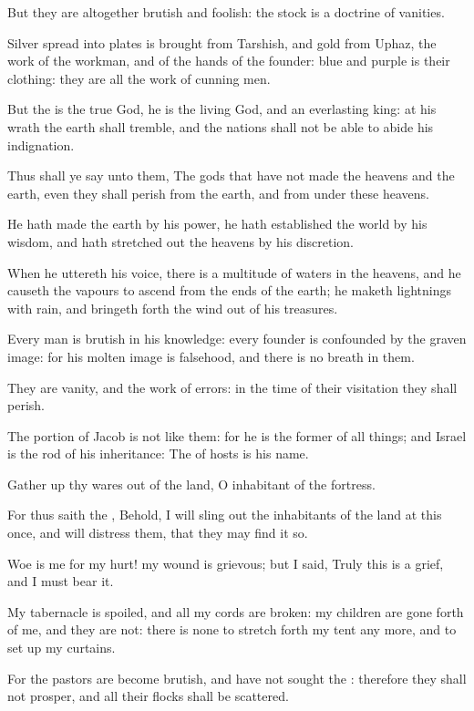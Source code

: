 \verse But they are altogether brutish and foolish: the stock is a doctrine of vanities.

\verse Silver spread into plates is brought from Tarshish, and gold from Uphaz, the work of the workman, and of the hands of the founder: blue and purple is their clothing: they are all the work of cunning men.

\verse But the \LORD is the true God, he is the living God, and an everlasting king: at his wrath the earth shall tremble, and the nations shall not be able to abide his indignation.

\verse Thus shall ye say unto them, The gods that have not made the heavens and the earth, even they shall perish from the earth, and from under these heavens.

\verse He hath made the earth by his power, he hath established the world by his wisdom, and hath stretched out the heavens by his discretion.

\verse When he uttereth his voice, there is a multitude of waters in the heavens, and he causeth the vapours to ascend from the ends of the earth; he maketh lightnings with rain, and bringeth forth the wind out of his treasures.

\verse Every man is brutish in his knowledge: every founder is confounded by the graven image: for his molten image is falsehood, and there is no breath in them.

\verse They are vanity, and the work of errors: in the time of their visitation they shall perish.

\verse The portion of Jacob is not like them: for he is the former of all things; and Israel is the rod of his inheritance: The \LORD of hosts is his name.

\verse Gather up thy wares out of the land, O inhabitant of the fortress.

\verse For thus saith the \LORD, Behold, I will sling out the inhabitants of the land at this once, and will distress them, that they may find it so.

\verse Woe is me for my hurt! my wound is grievous; but I said, Truly this is a grief, and I must bear it.

\verse My tabernacle is spoiled, and all my cords are broken: my children are gone forth of me, and they are not: there is none to stretch forth my tent any more, and to set up my curtains.

\verse For the pastors are become brutish, and have not sought the \LORD: therefore they shall not prosper, and all their flocks shall be scattered.

